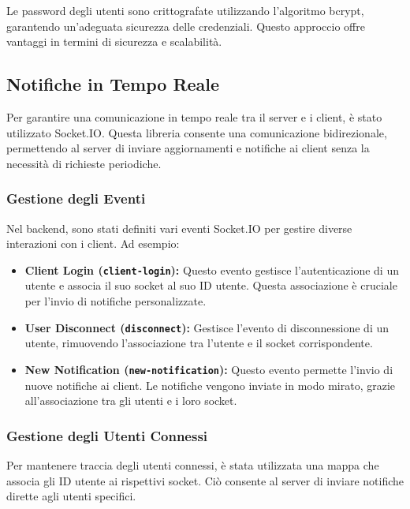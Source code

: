 Le password degli utenti sono crittografate utilizzando l'algoritmo bcrypt, garantendo un'adeguata sicurezza delle credenziali. Questo approccio offre vantaggi in termini di sicurezza e scalabilità.

\subsection{Notifiche in Tempo Reale}
Per garantire una comunicazione in tempo reale tra il server e i client, è stato utilizzato Socket.IO. Questa libreria consente una comunicazione bidirezionale, permettendo al server di inviare aggiornamenti e notifiche ai client senza la necessità di richieste periodiche.

\subsubsection{Gestione degli Eventi}

Nel backend, sono stati definiti vari eventi Socket.IO per gestire diverse interazioni con i client. Ad esempio:

\begin{itemize}
    \item \textbf{Client Login (\texttt{client-login}):} Questo evento gestisce l'autenticazione di un utente e associa il suo socket al suo ID utente. Questa associazione è cruciale per l'invio di notifiche personalizzate.

    \item \textbf{User Disconnect (\texttt{disconnect}):} Gestisce l'evento di disconnessione di un utente, rimuovendo l'associazione tra l'utente e il socket corrispondente.

    \item \textbf{New Notification (\texttt{new-notification}):} Questo evento permette l'invio di nuove notifiche ai client. Le notifiche vengono inviate in modo mirato, grazie all'associazione tra gli utenti e i loro socket.
\end{itemize}

\subsubsection{Gestione degli Utenti Connessi}

Per mantenere traccia degli utenti connessi, è stata utilizzata una mappa che associa gli ID utente ai rispettivi socket. Ciò consente al server di inviare notifiche dirette agli utenti specifici.

